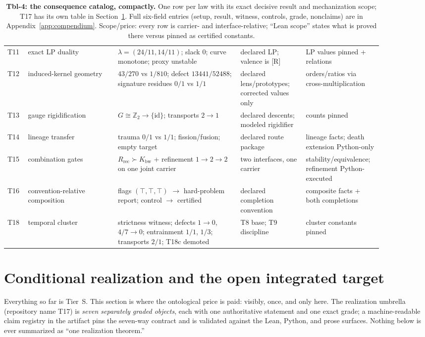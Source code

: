 \documentclass[11pt]{article}
\newcommand{\gradeR}{\textsf{[R]}}
\newcommand{\Kbw}{K_{\mathrm{bw}}}
\newcommand{\Rrec}{R_{\mathrm{rec}}}
\theoremstyle{definition}
\begin{document}
\begin{table}[p]
\begin{tabular}{p{0.05\linewidth}p{0.22\linewidth}p{0.3\linewidth}p{0.16\linewidth}p{0.15\linewidth}}
T11 & exact LP duality & $\lambda=(24/11,14/11)$; slack $0$; curve monotone; proxy unstable & declared LP; valence is \gradeR & LP values pinned + relations \\
T12 & induced-kernel geometry & $43/270$ vs $1/810$; defect $13441/52488$; signature residues $0/1$ vs $1/1$ & declared lens/prototypes; corrected values only & orders/ratios via cross-multiplication \\
T13 & gauge rigidification & $G \cong \mathbb{Z}_2 \to \{\mathrm{id}\}$; transports $2 \to 1$ & declared descents; modeled rigidifier & counts pinned \\
T14 & lineage transfer & trauma $0/1$ vs $1/1$; fission/fusion; empty target & declared route package & lineage facts; death extension Python-only \\
T15 & combination gates & $\Rrec \succ \Kbw$ + refinement $1\to2\to2$ on one joint carrier & two interfaces, one carrier & stability/equivalence; refinement Python-executed \\
T16 & convention-relative composition & flags $(\top,\top,\top)$ $\to$ hard-problem report; control $\to$ certified & declared completion convention & composite facts + both completions \\
T18 & temporal cluster & strictness witness; defects $1{\to}0$, $4/7{\to}0$; entrainment $1/1$, $1/3$; transports $2/1$; T18c demoted & T8 base; T9 discipline & cluster constants pinned \\
\bottomrule
\end{tabular}
\caption{\textbf{Tbl-4: the consequence catalog, compactly.} One row per law
with its exact decisive result and mechanization scope; T17 has its own table
in Section~\ref{sec:t17}. Full six-field entries (setup, result, witness,
controls, grade, nonclaims) are in Appendix~\ref{app:compendium}.
Scope/price: every row is carrier- and interface-relative; ``Lean scope''
states what is proved there versus pinned as certified constants.}
\label{tbl:catalog}
\end{table}

 \section{Conditional realization and the open integrated target}
\label{sec:t17}


Everything so far is Tier~S. This section is where the ontological price is
paid: visibly, once, and only here. The realization umbrella (repository
name T17) is \emph{seven separately graded objects}, each with one
authoritative statement and one exact grade; a machine-readable claim
registry in the artifact pins the seven-way contract and is validated against
the Lean, Python, and prose surfaces. Nothing below is ever summarized as
``one realization theorem.''
\end{document}
